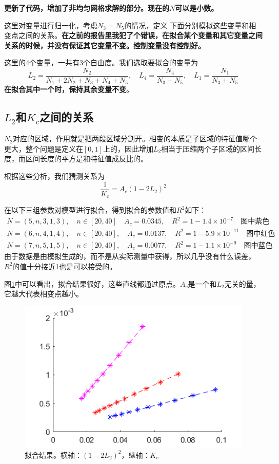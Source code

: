 \documentclass[12pt,a4paper]{article}
\begin{document}
\textbf{更新了代码，增加了非均匀网格求解的部分。现在的$N$可以是小数。}

这里对变量进行归一化，考虑$N_3=N_5$的情况，定义
下面分别模拟这些变量和相变点之间的关系。\textbf{在之前的报告里我犯了个错误，在拟合某个变量和其它变量之间关系的时候，并没有保证其它变量不变。控制变量没有控制好。}

这里的4个变量，一共有3个自由度。我们选取要拟合的变量为
$$ L_2 = \frac{N_2}{N_1 + 2 N_2 + N_3 + N_4 + N_5}, \quad L_4 = \frac{N_4}{N_3 + N_5}, \quad L_1 = \frac{N_1}{N_3 + N_5} $$
\textbf{在拟合其中一个时，保持其余变量不变}。

\subsection*{$L_2$和$K_c$之间的关系}

$N_2$对应的区域，作用就是把两段区域分割开。相变的本质是子区域的特征值哪个更大，整个问题是定义在$[0,1]$上的，因此增加$L_2$相当于压缩两个子区域的区间长度，而区间长度的平方是和特征值成反比的。

根据这些分析，我们猜测关系为
$$ \frac{1}{K_c} = A_c (1 - 2 L_2)^2 $$

在以下三组参数对模型进行拟合，得到拟合的参数值和$R^2$如下：
\begin{align*}
N=(5, n, 3, 1, 3), \quad n \in [20, 40] \quad A_c = 0.0345, \quad R^2 = 1 - 1.4 \times 10^{-7} \quad \text{图中紫色} \\
N=(6, n, 4, 1, 4), \quad n \in [20, 40], \quad A_c = 0.0137, \quad R^2 = 1 - 5.9 \times 10^{-11} \quad \text{图中红色} \\
N=(7, n, 5, 1, 5), \quad n \in [20, 40], \quad A_c = 0.0077, \quad R^2 = 1 - 1.1 \times 10^{-9} \quad \text{图中蓝色}
\end{align*}
由于数据是由模拟生成的，而不是从实际测量中获得，所以几乎没有什么误差，$R^2$的值十分接近1也是可以接受的。

图\ref{fn2}中可以看出，拟合结果很好，这些直线都通过原点。$A_c$是一个和$L_2$无关的量，它越大代表相变点越小。
\begin{figure}[h]
\centering
\includegraphics[width=0.4\linewidth]{L2Kc}
\caption{拟合结果。横轴：$(1-2L_2)^2$，纵轴：$K_c$}
\label{fn2}
\end{figure}
\end{document}
